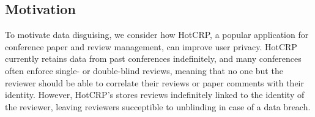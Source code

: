 \subsection{Motivation}
To motivate data disguising, we consider how HotCRP, a popular application for conference paper and
review management, can improve user privacy.  HotCRP currently retains data from past conferences
indefinitely, and many conferences often enforce single- or double-blind reviews, meaning that no
one but the reviewer should be able to correlate their reviews or paper comments with their
identity. However, HotCRP's stores reviews indefinitely linked to the identity of the reviewer,
leaving reviewers succeptible to unblinding in case of a data breach.

